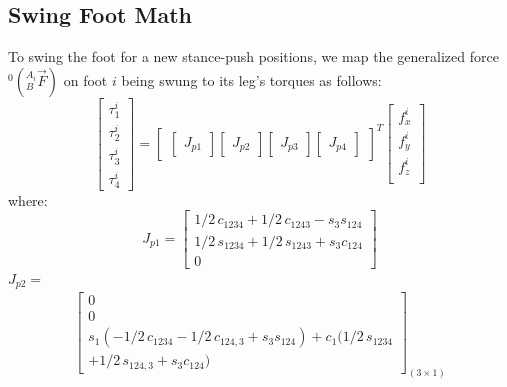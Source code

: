 \documentclass[]{article}
\begin{document}
\subsection{Swing Foot Math}
To swing the foot for a new stance-push positions, we map the generalized force  $^0(_B^{A_i}\vec{F})$ on foot $i$ being swung to its leg's torques as follows:
\begin{equation}
	\begin{bmatrix}
		\tau_1^i 	\\
		\tau_2^i	\\
		\tau_3^i	\\
		\tau_4^i	
	\end{bmatrix}
	=
	\begin{bmatrix}
		\begin{bmatrix}
			J_{p1}
		\end{bmatrix}
		\begin{bmatrix}
			J_{p2}
		\end{bmatrix}
		\begin{bmatrix}
			J_{p3}
		\end{bmatrix}
		\begin{bmatrix}
			J_{p4}
		\end{bmatrix}
	\end{bmatrix}^T	
	\begin{bmatrix}
	f_x^i 	\\
	f_y^i 	\\
	f_z^i	\\
	\end{bmatrix}
\end{equation} 
where:\\
\begin{equation}
J_{p1}=
\begin{bmatrix}
 	1/2\,c_{{1234}}+1/2\,c_{{1243}}-s_{{3}}s_{{124}}\\ 
	1/2\,s_{{1234}}+1/2\,s_{{1243}}+s_{{3}}c_{{124}}\\
	0
\end{bmatrix} \nonumber
\end{equation}
$J_{p2}=$
\begin{align*}
	\begin{bmatrix}
		0	\\	
		0	\\
		s_{{1}} ( -1/2\,c_{{1234}}-1/2\,c_{{124,3}}+s_{{3}}s_{{124}}
		) +c_{{1}} ( 1/2\,s_{{1234}}\\+1/2\,s_{{124,3}}+s_{{3}}c_{{
				124}} )
	\end{bmatrix}_{(3\times1)}
\end{align*}
\end{document}
